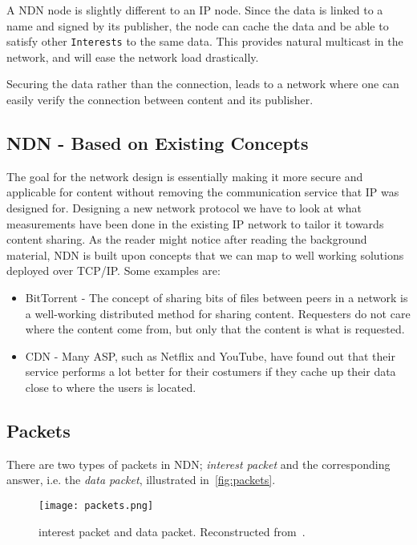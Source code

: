 A \gls{NDN} node is slightly different to an \gls{IP} node. 
Since the \gls{data} is linked to a \gls{name} and signed by its \gls{publisher}, the node can cache the \gls{data} and be able to satisfy other \texttt{Interests} to the same \gls{data}. 
This provides natural \gls{multicast} in the network, and will ease the network load drastically.

Securing the \gls{data} rather than the connection, leads to a network where one can easily verify the connection between content and its \gls{publisher}.

\subsection{NDN - Based on Existing Concepts}
The goal for the network design is essentially making it more secure and applicable for content without removing the communication service that \gls{IP} was designed for. 
Designing a new network protocol we have to look at what measurements have been done in the existing \gls{IP} network to tailor it towards content sharing.
As the reader might notice after reading the background material, \gls{NDN} is built upon concepts that we can map to well working solutions deployed over \gls{TCP}/\gls{IP}.
Some examples are:
\begin{itemize}
  \item BitTorrent - 
  The concept of sharing bits of files between peers in a network is a well-working distributed method for sharing content. 
  Requesters do not care where the content come from, but only that the content is what is requested.
  \item \gls{CDN} - 
  Many \gls{ASP}, such as Netflix and YouTube, have found out that their service performs a lot better for their costumers if they cache up their data close to where the users is located.
\end{itemize}

\subsection{Packets}\label{packets}
There are two types of packets in \gls{NDN};
\textit{\gls{interest} packet} and the corresponding answer, i.e. the \textit{\gls{data} packet}, illustrated in~\autoref{fig:packets}.

\begin{figure}[H]
  \centering
  \texttt{[image: packets.png]}
  \caption[NDN packets]{\gls{interest} packet and \gls{data} packet.
  Reconstructed from~\cite{jac09-03}.
  }
  \label{fig:packets}
\end{figure}

